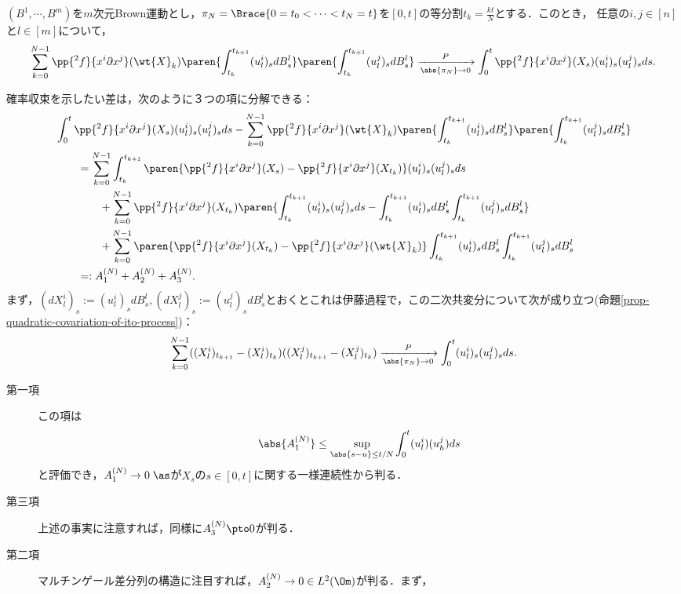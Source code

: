 \documentclass[uplatex,dvipdfmx]{jsreport}
\begin{document}
\begin{lemma}\label{lemma-Taylor-2-2-for-Ito-lemma}
    $(B^1,\cdots,B^m)$を$m$次元Brown運動とし，$\pi_N=\Brace{0=t_0<\cdots<t_N=t}$を$[0,t]$の等分割$t_k=\frac{kt}{N}$とする．このとき，
    任意の$i,j\in[n]$と$l\in[m]$について，
    \[\sum_{k=0}^{N-1}\pp{^2f}{x^i\partial x^j}(\wt{X}_k)\paren{\int^{t_{k+1}}_{t_k}(u^i_l)_sdB_s^l}\paren{\int^{t_{k+1}}_{t_k}(u^j_l)_sdB_s^l}\xrightarrow[\abs{\pi_N}\to0]{P}\int^t_0\pp{^2f}{x^i\partial x^j}(X_s)(u^i_l)_s(u^j_l)_sds.\]
\end{lemma}
\begin{Proof}
    確率収束を示したい差は，次のように３つの項に分解できる：
    \begin{align*}
        &\int^t_0\pp{^2f}{x^i\partial x^j}(X_s)(u^i_l)_s(u^j_l)_sds-\sum_{k=0}^{N-1}\pp{^2f}{x^i\partial x^j}(\wt{X}_k)\paren{\int^{t_{k+1}}_{t_k}(u^i_l)_sdB_s^l}\paren{\int^{t_{k+1}}_{t_k}(u^j_l)_sdB_s^l}\\
        &\qquad=\sum_{k=0}^{N-1}\int^{t_{k+1}}_{t_k}\paren{\pp{^2f}{x^i\partial x^j}(X_s)-\pp{^2f}{x^i\partial x^j}(X_{t_k})}(u^i_l)_s(u^j_l)_sds\\
        &\qquad\qquad+\sum_{k=0}^{N-1}\pp{^2f}{x^i\partial x^j}(X_{t_k})\paren{\int^{t_{k+1}}_{t_k}(u^i_l)_s(u^j_l)_sds-\int^{t_{k+1}}_{t_k}(u^i_l)_sdB_s^l\int^{t_{k+1}}_{t_k}(u^j_l)_sdB_s^l}\\
        &\qquad\qquad+\sum_{k=0}^{N-1}\paren{\pp{^2f}{x^i\partial x^j}(X_{t_k})-\pp{^2f}{x^i\partial x^j}(\wt{X}_k)}\int^{t_{k+1}}_{t_k}(u^i_l)_sdB_s^l\int^{t_{k+1}}_{t_k}(u^j_l)_sdB_s^l\\
        &\qquad=:A_1^{(N)}+A_2^{(N)}+A_3^{(N)}.
    \end{align*}
    まず，$(dX^i_l)_s:=(u^i_l)_sdB_s^l,(dX_l^j)_s:=(u^j_l)_sdB_s^l$とおくとこれは伊藤過程で，この二次共変分について次が成り立つ(命題\ref{prop-quadratic-covariation-of-ito-process})：
    \[\sum_{k=0}^{N-1}((X_l^i)_{t_{k+1}}-(X_l^i)_{t_k})((X_l^j)_{t_{k+1}}-(X_l^j)_{t_k})\xrightarrow[\abs{\pi_N}\to0]{P}\int^t_0(u_l^i)_s(u_l^j)_sds.\]
    \begin{description}
        \item[第一項] この項は
        \[\abs{A_1^{(N)}}\le\sup_{\abs{s-u}\le t/N}\int^t_0(u^i_l)(u^j_h)ds\]
        と評価でき，$A_1^{(N)}\to0\;\as$が$X_s$の$s\in[0,t]$に関する一様連続性から判る．
        \item[第三項] 上述の事実に注意すれば，同様に$A_3^{(N)}\pto0$が判る．
        \item[第二項] マルチンゲール差分列の構造に注目すれば，$A_2^{(N)}\to 0\in L^2(\Om)$が判る．まず，

\end{description}
\end{Proof}
\end{document}
